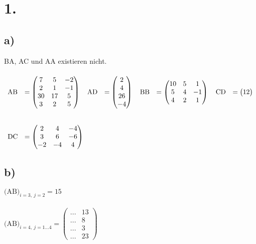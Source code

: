 \documentclass[a4paper]{scrartcl}
\title{\titleinfo}
\author{Arne Struck 6326505}
\date{28. November 2012}
\begin{document}
\maketitle
\notag
\section{1.}
	\subsection{a)}
		BA, AC und AA existieren nicht. \\ \\		
		\(
		\begin{array}{lllll}
			\text{AB}&=\begin{pmatrix}
				7&5&-2 \\2&1&-1 \\ 30&17&5 \\ 3&2&5 
			\end{pmatrix} \quad
			\text{AD}&=\begin{pmatrix}
				2 \\4 \\26 \\ -4
			\end{pmatrix}\quad
			\text{BB}&=\begin{pmatrix}
				10&5&1 \\ 5&4&-1 \\ 4&2&1
			\end{pmatrix}\quad
			\text{CD}&=\begin{pmatrix}
				12
			\end{pmatrix} \\  \\ \\
			\text{DC}&=\begin{pmatrix}
				2&4&-4 \\ 3&6&-6 \\ -2&-4&4
			\end{pmatrix} \\
		\end{array} \\ \\
		\)
		
		
	\subsection{b)}
		\(\text{(AB)}_{i=3,\ j=2}=15\) \\ \\
		\(\text{(AB)}_{i=4,\ j=1\dots 4}=\begin{pmatrix}
			...&13 \\
			...&8 \\
			...&3 \\
			...&23
		\end{pmatrix}\)
	
\end{document}
